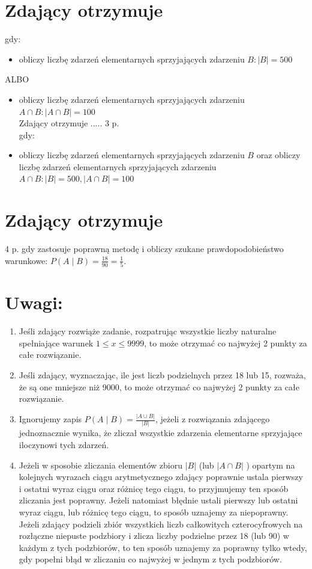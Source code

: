 \documentclass[10pt]{article}
\begin{document}
\section*{Zdający otrzymuje}
gdy:

\begin{itemize}
  \item obliczy liczbę zdarzeń elementarnych sprzyjających zdarzeniu $B:|B|=500$
\end{itemize}

ALBO

\begin{itemize}
  \item obliczy liczbę zdarzeń elementarnych sprzyjających zdarzeniu $A \cap B:|A \cap B|=100$\\
Zdający otrzymuje ..... 3 p.\\
gdy:
  \item obliczy liczbę zdarzeń elementarnych sprzyjających zdarzeniu $B$ oraz obliczy liczbę zdarzeń elementarnych sprzyjających zdarzeniu $A \cap B:|B|=500,|A \cap B|=100$
\end{itemize}

\section*{Zdający otrzymuje}
4 p. gdy zastosuje poprawną metodę i obliczy szukane prawdopodobieństwo warunkowe: $P(A \mid B)=\frac{18}{90}=\frac{1}{5}$.

\section*{Uwagi:}
\begin{enumerate}
  \item Jeśli zdający rozwiąże zadanie, rozpatrując wszystkie liczby naturalne spełniające warunek $1 \leq x \leq 9999$, to może otrzymać co najwyżej 2 punkty za całe rozwiązanie.
  \item Jeśli zdający, wyznaczając, ile jest liczb podzielnych przez 18 lub 15, rozważa, że są one mniejsze niż 9000, to może otrzymać co najwyżej 2 punkty za całe rozwiązanie.
  \item Ignorujemy zapis $P(A \mid B)=\frac{|A \cup B|}{|B|}$, jeżeli z rozwiązania zdającego jednoznacznie wynika, że zliczał wszystkie zdarzenia elementarne sprzyjające iloczynowi tych zdarzeń.
  \item Jeżeli w sposobie zliczania elementów zbioru $|B|$ (lub $|A \cap B|$ ) opartym na kolejnych wyrazach ciągu arytmetycznego zdający poprawnie ustala pierwszy i ostatni wyraz ciągu oraz różnicę tego ciągu, to przyjmujemy ten sposób zliczania jest poprawny. Jeżeli natomiast błędnie ustali pierwszy lub ostatni wyraz ciągu, lub różnicę tego ciągu, to sposób uznajemy za niepoprawny. Jeżeli zdający podzieli zbiór wszystkich liczb całkowitych czterocyfrowych na rozłączne niepuste podzbiory i zlicza liczby podzielne przez 18 (lub 90) w każdym z tych podzbiorów, to ten sposób uznajemy za poprawny tylko wtedy, gdy popełni błąd w zliczaniu co najwyżej w jednym z tych podzbiorów.
\end{enumerate}
\end{document}
